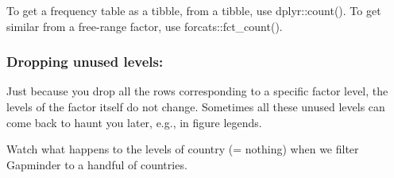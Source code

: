 \documentclass[]{book}
\newenvironment{Shaded}{\begin{snugshade}}{\end{snugshade}}
\newcommand{\KeywordTok}[1]{\textcolor[rgb]{0.13,0.29,0.53}{\textbf{#1}}}
\newcommand{\StringTok}[1]{\textcolor[rgb]{0.31,0.60,0.02}{#1}}
\newcommand{\OperatorTok}[1]{\textcolor[rgb]{0.81,0.36,0.00}{\textbf{#1}}}
\newcommand{\NormalTok}[1]{#1}
\begin{document}
\begin{Shaded}
\end{Shaded}

To get a frequency table as a tibble, from a tibble, use dplyr::count().
To get similar from a free-range factor, use forcats::fct\_count().

\begin{Shaded}
\end{Shaded}

\subsubsection{Dropping unused levels:}\label{dropping-unused-levels}

Just because you drop all the rows corresponding to a specific factor
level, the levels of the factor itself do not change. Sometimes all
these unused levels can come back to haunt you later, e.g., in figure
legends.

Watch what happens to the levels of country (= nothing) when we filter
Gapminder to a handful of countries.

\begin{Shaded}
\end{Shaded}
\end{document}
